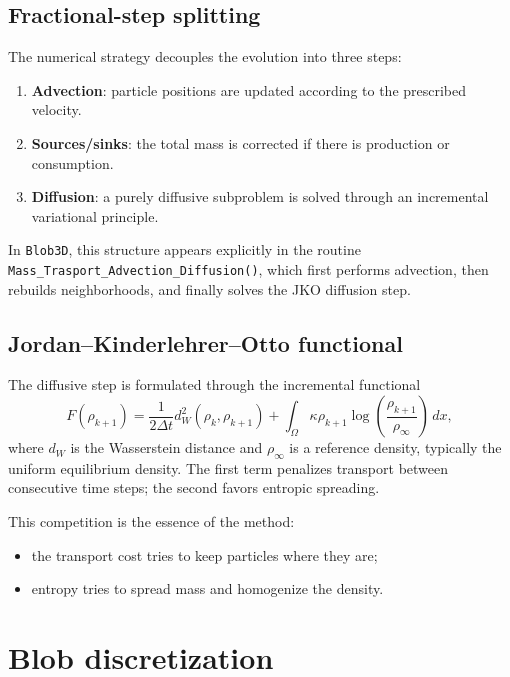\documentclass[11pt,a4paper]{article}
\begin{document}
\subsection{Fractional-step splitting}
The numerical strategy decouples the evolution into three steps:
\begin{enumerate}[label=\arabic*.]
  \item \textbf{Advection}: particle positions are updated according to the prescribed velocity.
  \item \textbf{Sources/sinks}: the total mass is corrected if there is production or consumption.
  \item \textbf{Diffusion}: a purely diffusive subproblem is solved through an incremental variational principle.
\end{enumerate}

In \texttt{Blob3D}, this structure appears explicitly in the routine \texttt{Mass\_Trasport\_Advection\_Diffusion()}, which first performs advection, then rebuilds neighborhoods, and finally solves the JKO diffusion step.

\subsection{Jordan--Kinderlehrer--Otto functional}
The diffusive step is formulated through the incremental functional \citep{jordan1998,fedeli2017,pandolfi2023}
\begin{equation}
F(\rho_{k+1}) =
\frac{1}{2\Delta t} d_W^2(\rho_k,\rho_{k+1})
+
\int_{\Omega}
\kappa \rho_{k+1}
\log\!\left(\frac{\rho_{k+1}}{\rho_\infty}\right)\,dx,
\end{equation}
where $d_W$ is the Wasserstein distance and $\rho_\infty$ is a reference density, typically the uniform equilibrium density. The first term penalizes transport between consecutive time steps; the second favors entropic spreading.

This competition is the essence of the method:
\begin{itemize}[leftmargin=*]
  \item the transport cost tries to keep particles where they are;
  \item entropy tries to spread mass and homogenize the density.
\end{itemize}

\section{Blob discretization}
\end{document}
